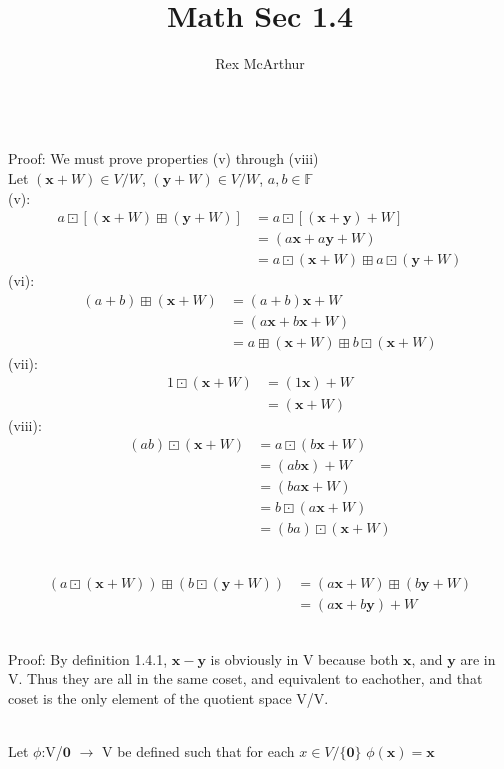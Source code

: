 \documentclass[letterpaper,12pt]{article}
\title{Math Sec 1.4}
\author{Rex McArthur}
\theoremstyle{definition}
\begin{document}
\maketitle
{}\\
Proof: We must prove properties (v) through (viii)\\
Let $(\mathbf{x}+W) \in V/W$, $(\mathbf{y}+W) \in V/W$, $a,b \in \mathbb{F}$\\
(v): 
\begin{align*}
    a \boxdot [(\mathbf{x} + W ) \boxplus ( \mathbf{y} +W)] 
    & = a \boxdot [( \mathbf{x}+\mathbf{y})+W]\\
    & = (a \mathbf{x} + a \mathbf{y} +W)\\
    & = a \boxdot (\mathbf{x}+W) \boxplus a \boxdot (\mathbf{y}+W)
\end{align*}
(vi):
\begin{align*}
    (a+b) \boxplus ( \mathbf{x} + W) &= (a+b)\mathbf{x} + W\\
    & = (a \mathbf{x} + b \mathbf{x} + W)\\
    & = a \boxplus(\mathbf{x} + W) \boxplus b \boxdot (\mathbf{x}+W)
\end{align*}
(vii):
\begin{align*}
    1\boxdot (\mathbf{x} + W) & = (1 \mathbf{x}) + W\\
    & = (\mathbf{x} + W)
\end{align*}
(viii):
\begin{align*}
    (ab) \boxdot (\mathbf{x} + W) & = a \boxdot(b \mathbf{x} + W)\\
    & = (ab \mathbf{x}) + W \\
    & = (ba \mathbf{x} + W)\\
    & = b \boxdot (a \mathbf{x} + W)\\
    & = (ba) \boxdot (\mathbf{x} + W)
\end{align*}

\\
\begin{align*}
    (a \boxdot (\mathbf{x} + W)) \boxplus ( b \boxdot (\mathbf{y} +W)) & = (a \mathbf{x}+W)
        \boxplus (b \mathbf{y} + W)\\
        & = (a \mathbf{x} + b \mathbf{y}) +W
\end{align*}

\\
Proof: By definition 1.4.1, $\mathbf{x} - \mathbf{y}$ is obviously in V because both $\mathbf{x}$, and $ \mathbf{y}$ are in V. Thus they are all in the same coset, and equivalent to eachother, and that coset is the only element of the quotient space V/V.

\\
Let $\phi$:V/{$\mathbf{0}$} $\rightarrow$ V be defined such that for each $x \in V/\{\mathbf{0}\}$ $ \phi(\mathbf{x}) = \mathbf{x}$
\end{document}
